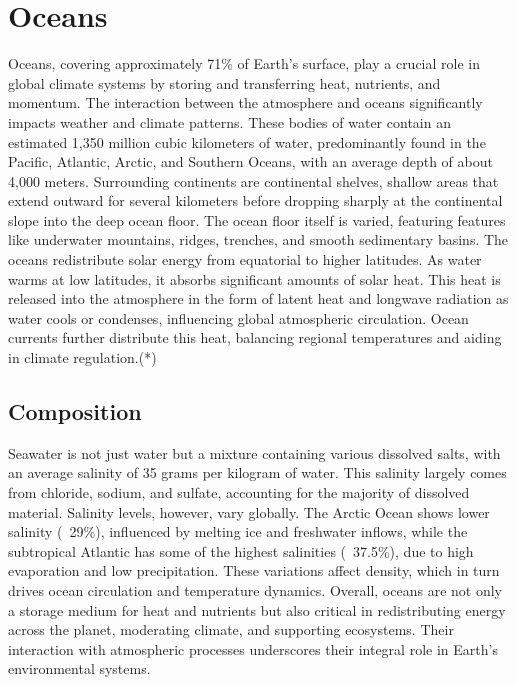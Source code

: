 \section{Oceans}
Oceans, covering approximately 71\% of Earth's surface, play a crucial role in global climate systems by storing and transferring heat, nutrients, and momentum. The interaction between the atmosphere and oceans significantly impacts weather and climate patterns. These bodies of water contain an estimated 1,350 million cubic kilometers of water, predominantly found in the Pacific, Atlantic, Arctic, and Southern Oceans, with an average depth of about 4,000 meters.
\newline Surrounding continents are continental shelves, shallow areas that extend outward for several kilometers before dropping sharply at the continental slope into the deep ocean floor. The ocean floor itself is varied, featuring features like underwater mountains, ridges, trenches, and smooth sedimentary basins.
\newline The oceans redistribute solar energy from equatorial to higher latitudes. As water warms at low latitudes, it absorbs significant amounts of solar heat. This heat is released into the atmosphere in the form of latent heat and longwave radiation as water cools or condenses, influencing global atmospheric circulation. Ocean currents further distribute this heat, balancing regional temperatures and aiding in climate regulation.(*)
\subsection{Composition} Seawater is not just water but a mixture containing various dissolved salts, with an average salinity of 35 grams per kilogram of water. This salinity largely comes from chloride, sodium, and sulfate, accounting for the majority of dissolved material. Salinity levels, however, vary globally. The Arctic Ocean shows lower salinity (~29\%), influenced by melting ice and freshwater inflows, while the subtropical Atlantic has some of the highest salinities (~37.5\%), due to high evaporation and low precipitation. These variations affect density, which in turn drives ocean circulation and temperature dynamics.
Overall, oceans are not only a storage medium for heat and nutrients but also critical in redistributing energy across the planet, moderating climate, and supporting ecosystems. Their interaction with atmospheric processes underscores their integral role in Earth's environmental systems.
